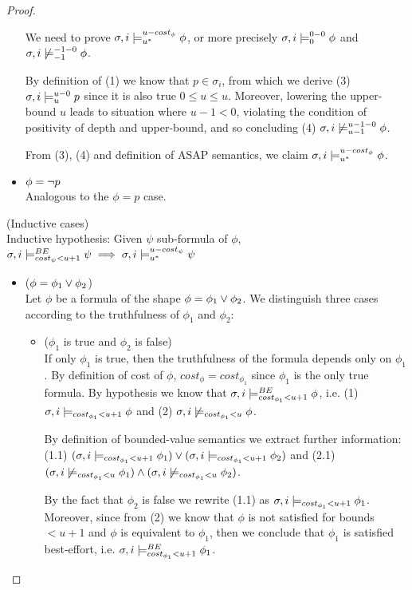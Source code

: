 \begin{theorem}
\begin{proof}
\begin{itemize}
    We need to prove $\sigma,i \models_{{u}^*}^{u-cost_\phi} \phi$, or more precisely $\sigma,i \models_{0}^{0-0} \phi$ and $\sigma,i \not\models_{-1}^{-1-0} \phi$.

    By definition of (1) we know that $p \in \sigma_i$, from which we derive (3) $\sigma,i \models_{u}^{u-0} p$ since it is also true $0 \leq u \leq u$.
    Moreover, lowering the upper-bound $u$ leads to situation where $u-1 < 0$, violating the condition of positivity of depth and upper-bound, and so concluding (4) $\sigma,i \not\models_{u-1}^{u-1-0} \phi$.

    From (3), (4) and definition of ASAP semantics, we claim $\sigma,i \models_{{u}^*}^{u-cost_\phi} \phi$.

    \item $\phi = \neg p$ \\
    Analogous to the $\phi = p$ case.
\end{itemize}

\noindent (Inductive cases) \\
Inductive hypothesis: Given $\psi$ sub-formula of $\phi$, $\sigma,i \models_{cost_\psi < u+1}^{BE} \psi \implies \sigma,i \models_{{u}^*}^{u-cost_\psi} \psi$
\begin{itemize}
    \item ($\phi = \phi_1 \lor \phi_2$) \\
    Let $\phi$ be a formula of the shape $\phi = \phi_1 \lor \phi_2$.
    We distinguish three cases according to the truthfulness of $\phi_1$ and $\phi_2$:
    \begin{itemize}
        \item ($\phi_1$ is true and $\phi_2$ is false) \\
        If only $\phi_1$ is true, then the truthfulness of the formula depends only on $\phi_1$.
        By definition of cost of $\phi$, $cost_\phi = cost_{\phi_1}$ since $\phi_1$ is the only true formula.
        By hypothesis we know that $\sigma,i \models_{cost_{\phi_1} < u+1}^{BE} \phi$, i.e. (1) $\sigma,i \models_{cost_{\phi_1} < u+1} \phi$ and (2) $\sigma,i \not\models_{cost_{\phi_1} < u} \phi$.
        
        By definition of bounded-value semantics we extract further information: 
        (1.1) $(\sigma,i \models_{cost_{\phi_1} < u+1} \phi_1) \lor (\sigma,i \models_{cost_{\phi_1} < u+1} \phi_2)$ and 
        (2.1) $(\sigma,i \not\models_{cost_{\phi_1} < u} \phi_1) \land (\sigma,i \not\models_{cost_{\phi_1} < u} \phi_2)$.

        By the fact that $\phi_2$ is false we rewrite (1.1) as $\sigma,i \models_{cost_{\phi_1} < u+1} \phi_1$. 
        Moreover, since from (2) we know that $\phi$ is not satisfied for bounds $< u+1$ and $\phi$ is equivalent to $\phi_1$, then we conclude that $\phi_1$ is satisfied best-effort, i.e. $\sigma,i \models_{cost_{\phi_1} < u+1}^{BE} \phi_1$.


\end{itemize}
\end{itemize}
\end{proof}
\end{theorem}
